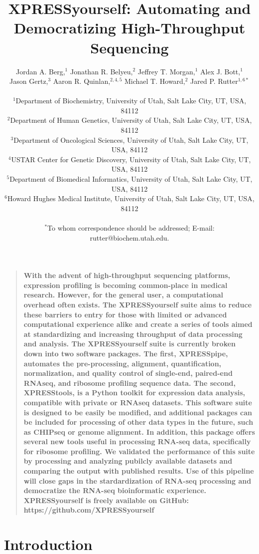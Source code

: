 \documentclass[11pt, a4paper, oneside]{article}
\title{
XPRESSyourself: Automating and Democratizing High-Throughput Sequencing
}
\author{
Jordan A. Berg,$^{1}$ Jonathan R. Belyeu,$^{2}$ Jeffrey T. Morgan,$^{1}$ Alex J. Bott,$^{1}$ \\
Jason Gertz,$^{3}$ Aaron R. Quinlan,$^{2,4,5}$ Michael T. Howard,$^{2}$ Jared P. Rutter$^{1,6\ast}$\\
\\
\normalsize{$^{1}$Department of Biochemistry, University of Utah, Salt Lake City, UT, USA, 84112}\\
\normalsize{$^{2}$Department of Human Genetics, University of Utah, Salt Lake City, UT, USA, 84112}\\
\normalsize{$^{3}$Department of Oncological Sciences, University of Utah, Salt Lake City, UT, USA, 84112}\\
\normalsize{$^{4}$USTAR Center for Genetic Discovery, University of Utah, Salt Lake City, UT, USA, 84112}\\
\normalsize{$^{5}$Department of Biomedical Informatics, University of Utah, Salt Lake City, UT, USA, 84112}\\
\normalsize{$^{6}$Howard Hughes Medical Institute, University of Utah, Salt Lake City, UT, USA, 84112}\\
\\
\normalsize{$^\ast$To whom correspondence should be addressed; E-mail: rutter@biochem.utah.edu.}
}
\date{}
\newenvironment{sciabstract}{%
\begin{quote} \bf}
{\end{quote}}
\begin{document}
\baselineskip24pt

\maketitle



\begin{sciabstract}
With the advent of high-throughput sequencing platforms, expression profiling is becoming common-place in medical research. However, for the general user, a computational overhead often exists. The XPRESSyourself suite aims to reduce these barriers to entry for those with limited or advanced computational experience alike and create a series of tools aimed at standardizing and increasing throughput of data processing and analysis. The XPRESSyourself suite is currently broken down into two software packages. The first, XPRESSpipe, automates the pre-processing, alignment, quantification, normalization, and quality control of single-end, paired-end RNAseq, and ribosome profiling sequence data. The second, XPRESStools, is a Python toolkit for expression data analysis, compatible with private or RNAseq datasets. This software suite is designed to be easily be modified, and additional packages can be included for processing of other data types in the future, such as CHIPseq or genome alignment. In addition, this package offers several new tools useful in processing RNA-seq data, specifically for ribosome profiling. We validated the performance of this suite by processing and analyzing pubilcly available datasets and comparing the output with published results. Use of this pipeline will close gaps in the stardardization of RNA-seq processing and democratize the RNA-seq bioinformatic experience.
\newline\\
\normalfont XPRESSyourself is freely available on GitHub: https://github.com/XPRESSyourself\\
\end{sciabstract}


\section{Introduction}
\end{document}
